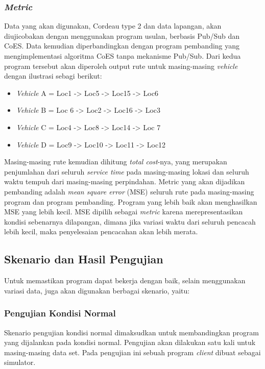 \subsubsection{\textit{Metric}}
Data yang akan digunakan, Cordeau type 2 dan data lapangan, akan diujicobakan dengan menggunakan program usulan, berbasis Pub/Sub dan CoES. Data kemudian diperbandingkan dengan program pembanding yang mengimplementasi algoritma CoES tanpa mekanisme Pub/Sub. Dari kedua program tersebut akan diperoleh output rute untuk masing-masing \textit{vehicle} dengan ilustrasi sebagi berikut:

\begin{itemize}
\item \textit{Vehicle} A = Loc1 -> Loc5 -> Loc15 -> Loc6
\item \textit{Vehicle} B = Loc 6 -> Loc2 -> Loc16 -> Loc3
\item \textit{Vehicle} C = Loc4 -> Loc8 -> Loc14 -> Loc 7
\item \textit{Vehicle} D = Loc9 -> Loc10 -> Loc11 -> Loc12
\end{itemize}


Masing-masing rute kemudian dihitung \textit{total cost}-nya, yang merupakan penjumlahan dari seluruh \textit{service time} pada masing-masing lokasi dan seluruh waktu tempuh dari masing-masing perpindahan. Metric yang akan dijadikan pembanding adalah \textit{mean square error} (MSE) seluruh rute pada masing-masing program dan program pembanding. Program yang lebih baik akan menghasilkan MSE yang lebih kecil. MSE dipilih sebagai \textit{metric} karena merepresentasikan kondisi sebenarnya dilapangan, dimana jika variasi waktu dari seluruh pencacah lebih kecil, maka penyelesaian pencacahan akan lebih merata.


\subsection{Skenario dan Hasil Pengujian}
Untuk memastikan program dapat bekerja dengan baik, selain menggunakan variasi data, juga akan digunakan berbagai skenario, yaitu:

\subsubsection{Pengujian Kondisi Normal}
Skenario pengujian kondisi normal dimaksudkan untuk membandingkan program yang dijalankan pada kondisi normal. Pengujian akan dilakukan satu kali untuk masing-masing data set. Pada pengujian ini sebuah program \textit{client} dibuat sebagai simulator.


